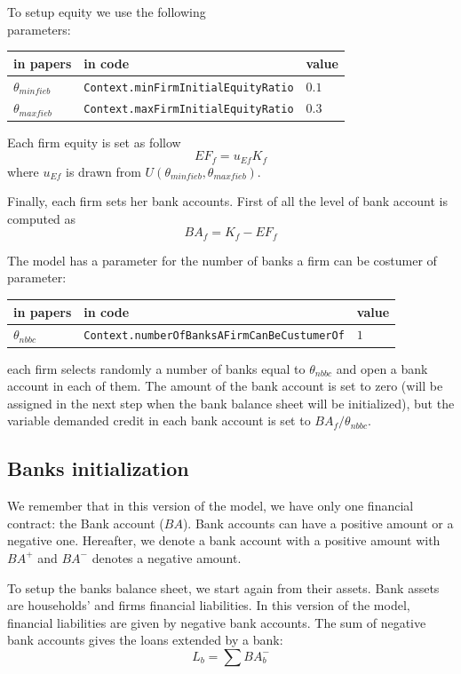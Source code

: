 \documentclass{book}
\begin{document}
To setup equity we use the following\\
parameters:\\
\begin{tabular}{l l l}
	\hline
	in papers& in code&value\\
	\hline
	\hline
 $\theta_{minfieb}$&\verb+Context.minFirmInitialEquityRatio+&$0.1$\\
 $\theta_{maxfieb}$&\verb+Context.maxFirmInitialEquityRatio+&$0.3$\\
	\hline
\end{tabular}

\vskip5mm
Each firm equity is set as follow
\[
	EF_f=u_{Ef}K_f
\]
where $u_{Ef}$ is drawn from $U(\theta_{minfieb},\theta_{maxfieb})$.

Finally, each firm sets her bank accounts. First of all the level of bank account is computed as
\[
BA_f=K_f-EF_f
\]

The model has a parameter for the number of banks a firm can be costumer of\\
parameter:\\
\begin{tabular}{l l l}
	\hline
	in papers& in code&value\\
	\hline
	\hline
 $\theta_{nbbc}$&\verb+Context.numberOfBanksAFirmCanBeCustumerOf+&$1$\\
	\hline
\end{tabular}

\vskip5mm
each firm selects randomly a number of banks equal to $\theta_{nbbc}$ and open a bank account in each of them. The amount of the bank account is set to zero (will be assigned in the next step when the bank balance sheet will be initialized), but the variable demanded credit in each bank account is set to $BA_f/\theta_{nbbc}$.


\subsection{Banks initialization}
We remember that in this version of the model, we have only one financial contract: the Bank account ($BA$). Bank accounts can have a positive amount or a negative one. Hereafter, we denote a bank account with a positive amount with $BA^+$ and  $BA^-$ denotes a negative amount.

To setup the banks balance sheet, we start again from their assets. Bank assets are households' and firms financial liabilities. In this version of the model, financial liabilities are given by negative bank accounts. 
The sum of negative bank accounts gives the loans extended by a bank:
\[
L_b=\sum BA_b^-
\]
\end{document}
